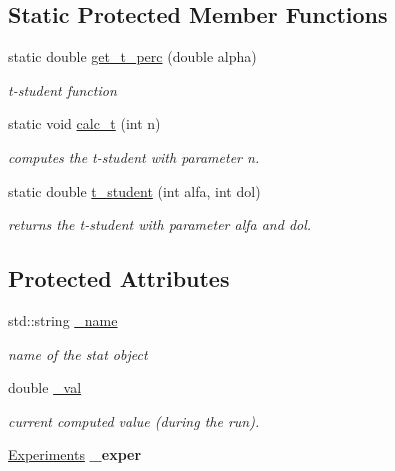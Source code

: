 \subsection*{Static Protected Member Functions}
\begin{DoxyCompactItemize}
\item 
static double \hyperlink{group__metasim__stat_ga2001c33bd7f3a451b279cc0e7be1bcab}{get\+\_\+t\+\_\+perc} (double alpha)
\begin{DoxyCompactList}\small\item\em t-\/student function \end{DoxyCompactList}\item 
static void \hyperlink{group__metasim__stat_ga4b367dd65c3cbaba03adfc6b2105a4d1}{calc\+\_\+t} (int n)
\begin{DoxyCompactList}\small\item\em computes the t-\/student with parameter n. \end{DoxyCompactList}\item 
static double \hyperlink{group__metasim__stat_ga72c3e88d10989f82926d1e4622a741a2}{t\+\_\+student} (int alfa, int dol)
\begin{DoxyCompactList}\small\item\em returns the t-\/student with parameter alfa and dol. \end{DoxyCompactList}\end{DoxyCompactItemize}
\subsection*{Protected Attributes}
\begin{DoxyCompactItemize}
\item 
std\+::string \hyperlink{group__metasim__stat_gadc11fad00a3ef6ab589510c4ed514625}{\+\_\+name}
\begin{DoxyCompactList}\small\item\em name of the stat object \end{DoxyCompactList}\item 
double \hyperlink{group__metasim__stat_ga64ad3d61015bd5b232df8ae12a5e9b8f}{\+\_\+val}
\begin{DoxyCompactList}\small\item\em current computed value (during the run). \end{DoxyCompactList}\item 
\hyperlink{group__metasim__stat_ga2bae1d8abdacdd19f279cba4b73f4b7e}{Experiments} {\bfseries \+\_\+exper}
\end{DoxyCompactItemize}
